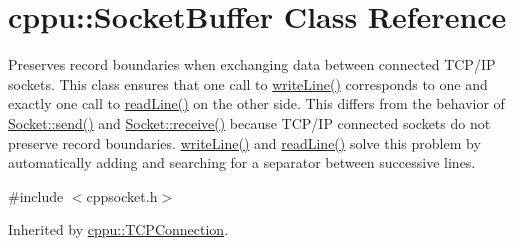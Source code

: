 \hypertarget{classcppu_1_1_socket_buffer}{\section{cppu\+:\+:Socket\+Buffer Class Reference}
\label{classcppu_1_1_socket_buffer}
}


Preserves record boundaries when exchanging data between connected T\+C\+P/\+I\+P sockets. This class ensures that one call to \hyperlink{classcppu_1_1_socket_buffer_a92ae0351aaee8719d34e8c4618495d59}{write\+Line()} corresponds to one and exactly one call to \hyperlink{classcppu_1_1_socket_buffer_a222769d3776b9cbd3a727ee1f0e60358}{read\+Line()} on the other side. This differs from the behavior of \hyperlink{classcppu_1_1_socket_aeac77f859159715e2d63a5a0dc118788}{Socket\+::send()} and \hyperlink{classcppu_1_1_socket_a37c382af52cc02f92c0e19a0c6e0e04f}{Socket\+::receive()} because T\+C\+P/\+I\+P connected sockets do not preserve record boundaries. \hyperlink{classcppu_1_1_socket_buffer_a92ae0351aaee8719d34e8c4618495d59}{write\+Line()} and \hyperlink{classcppu_1_1_socket_buffer_a222769d3776b9cbd3a727ee1f0e60358}{read\+Line()} solve this problem by automatically adding and searching for a separator between successive lines.  




{\ttfamily \#include $<$cppsocket.\+h$>$}



Inherited by \hyperlink{classcppu_1_1_t_c_p_connection}{cppu\+::\+T\+C\+P\+Connection}.


